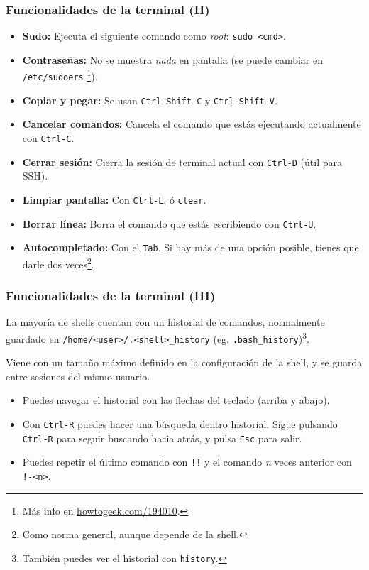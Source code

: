 \documentclass[aspectratio=43]{beamer}
\begin{document}
\begin{frame}
    \frametitle{Funcionalidades de la terminal (II)}

    \begin{itemize}
        \item \textbf{Sudo:} Ejecuta el siguiente comando como \textit{root}: \texttt{sudo <cmd>}.
        \item \textbf{Contraseñas:} No se muestra \textit{nada} en pantalla (se puede cambiar en \texttt{/etc/sudoers} \footnote{Más info en \href{https://www.howtogeek.com/194010/how-to-make-password-asterisks-visible-in-the-terminal-window-in-linux/}{howtogeek.com/194010}.}). 
        \item \textbf{Copiar y pegar:} Se usan \texttt{Ctrl-Shift-C} y \texttt{Ctrl-Shift-V}.
        \item \textbf{Cancelar comandos:} Cancela el comando que estás ejecutando actualmente con \texttt{Ctrl-C}.
        \item \textbf{Cerrar sesión:} Cierra la sesión de terminal actual con \texttt{Ctrl-D} (útil para SSH).
        \item \textbf{Limpiar pantalla:} Con \texttt{Ctrl-L}, ó \texttt{clear}.
        \item \textbf{Borrar línea:} Borra el comando que estás escribiendo con \texttt{Ctrl-U}.
        \item \textbf{Autocompletado:} Con el \texttt{Tab}. Si hay más de una opción posible, tienes que darle dos veces\footnote{Como norma general, aunque depende de la shell.}.
    \end{itemize}

\end{frame}

\begin{frame}
    \frametitle{Funcionalidades de la terminal (III)}
    
    La mayoría de shells cuentan con un historial de comandos, normalmente guardado en \texttt{/home/<user>/.<shell>\_history} (eg. \texttt{.bash\_history})\footnote{También puedes ver el historial con \texttt{history}.}.\newline
    
    Viene con un tamaño máximo definido en la configuración de la shell, y se guarda entre sesiones del mismo usuario.
    \begin{itemize}
        \item Puedes navegar el historial con las flechas del teclado (arriba y abajo).
        \item Con \texttt{Ctrl-R} puedes hacer una búsqueda dentro historial. Sigue pulsando \texttt{Ctrl-R} para seguir buscando hacia atrás, y pulsa \texttt{Esc} para salir.
        \item Puedes repetir el último comando con \texttt{!!} y el comando \textit{n} veces anterior con \texttt{!-<n>}.
    \end{itemize}

\end{frame}
\end{document}
